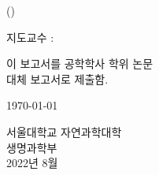 \makeatletter

\begin{titlepage}
  \begin{center}
    \vspace*{1cm}

    \HUGE{\@title\\}
    \LARGE{(\@titlealt)}

    \vfill

    \LARGE{지도교수 : \@advisor}

    \vfill

    \huge{
      이 보고서를 공학학사 학위 논문\\
      대체 보고서로 제출함.
    }

    \vfill

    \LARGE{
      \today
    }

    \vfill

    \huge{
      서울대학교 자연과학대학\\
      생명과학부\\
      \@author
    }
    \vfill
    \huge{2022년 8월}

    \vspace*{1cm}
  \end{center}
\end{titlepage}
\makeatother
